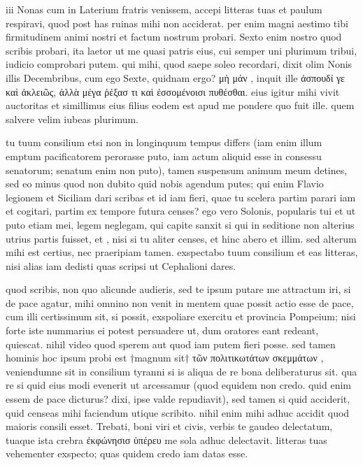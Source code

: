 


 iii Nonas cum in Laterium fratris venissem, accepi litteras tuas et paulum respiravi, quod post has ruinas mihi non acciderat. per enim magni aestimo tibi firmitudinem animi nostri et factum nostrum probari. Sexto enim nostro quod scribis probari, ita laetor ut me quasi patris eius, cui semper uni plurimum tribui, iudicio comprobari putem. qui mihi, quod saepe soleo recordari, dixit olim Nonis illis Decembribus, cum ego Sexte, quidnam ergo? μὴ μάν , inquit ille ἀσπουδί γε καὶ ἀκλειῶς, ἀλλὰ μέγα ῤέξασ τι καὶ ἐσσομένοισι πυθέσθαι. eius igitur mihi vivit auctoritas et simillimus eius filius eodem est apud me pondere quo fuit ille. quem salvere velim iubeas plurimum.

 tu tuum consilium etsi non in longinquum tempus differs (iam enim illum emptum pacificatorem perorasse puto, iam actum aliquid esse in consessu senatorum; senatum enim non puto), tamen suspensum animum meum detines, sed eo minus quod non dubito quid nobis agendum putes; qui enim Flavio legionem et Siciliam dari scribas et id iam fieri, quae tu scelera partim parari iam et cogitari, partim ex tempore futura censes? ego vero Solonis, popularis tui et ut puto etiam mei, legem neglegam, qui capite sanxit si qui in seditione non alterius utrius partis fuisset, et , nisi si tu aliter censes, et hinc abero et illim. sed alterum mihi est certius, nec praeripiam tamen. exspectabo tuum consilium et eas litteras, nisi alias iam dedisti quas scripsi ut Cephalioni dares.

 quod scribis, non quo alicunde audieris, sed te ipsum putare me attractum iri, si de pace agatur, mihi omnino non venit in mentem quae possit actio esse de pace, cum illi certissimum sit, si possit, exspoliare exercitu et provincia Pompeium; nisi forte iste nummarius ei potest persuadere ut, dum oratores eant redeant, quiescat. nihil video quod sperem aut quod iam putem fieri posse. sed tamen hominis hoc ipsum probi est †magnum sit† τῶν πολιτικωτάτων σκεμμάτων , veniendumne sit in consilium tyranni si is aliqua de re bona deliberaturus sit. qua re si quid eius modi evenerit ut arcessamur (quod equidem non credo. quid enim essem de pace dicturus? dixi, ipse valde repudiavit), sed tamen si quid acciderit, quid censeas mihi faciendum utique scribito. nihil enim mihi adhuc accidit quod maioris consili esset. Trebati, boni viri et civis, verbis te gaudeo delectatum, tuaque ista crebra ἐκφώνησισ ὑπέρευ me sola adhuc delectavit. litteras tuas vehementer exspecto; quas quidem credo iam datas esse.

